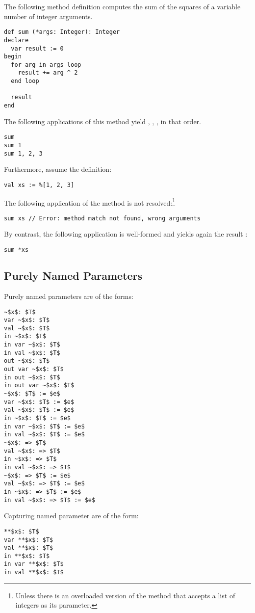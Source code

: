 \example The following method definition computes the sum of the squares of a variable number of integer arguments.
\begin{lstlisting}
def sum (*args: Integer): Integer
declare
  var result := 0
begin
  for arg in args loop
    result += arg ^ 2
  end loop
  
  result
end
\end{lstlisting}
The following applications of this method yield , , , in that order.
\begin{lstlisting}
sum
sum 1
sum 1, 2, 3
\end{lstlisting}
Furthermore, assume the definition:
\begin{lstlisting}
val xs := %[1, 2, 3]
\end{lstlisting}
The following application of the method  is not resolved:\footnote{Unless there is an overloaded version of the method that accepts a list of integers as its parameter.}
\begin{lstlisting}
sum xs // Error: method match not found, wrong arguments
\end{lstlisting}
By contrast, the following application is well-formed and yields again the result :
\begin{lstlisting}
sum *xs
\end{lstlisting}






\subsection{Purely Named Parameters}
\label{sec:named-parameters}
\label{sec:capturing-named-parameter}

Purely named parameters are of the forms:
\begin{lstlisting}
~$x$: $T$
var ~$x$: $T$
val ~$x$: $T$
in ~$x$: $T$
in var ~$x$: $T$
in val ~$x$: $T$
out ~$x$: $T$
out var ~$x$: $T$
in out ~$x$: $T$
in out var ~$x$: $T$
~$x$: $T$ := $e$
var ~$x$: $T$ := $e$
val ~$x$: $T$ := $e$
in ~$x$: $T$ := $e$
in var ~$x$: $T$ := $e$
in val ~$x$: $T$ := $e$
~$x$: => $T$
val ~$x$: => $T$
in ~$x$: => $T$
in val ~$x$: => $T$
~$x$: => $T$ := $e$
val ~$x$: => $T$ := $e$
in ~$x$: => $T$ := $e$
in val ~$x$: => $T$ := $e$
\end{lstlisting}

Capturing named parameter are of the form: 
\begin{lstlisting}
**$x$: $T$
var **$x$: $T$
val **$x$: $T$
in **$x$: $T$
in var **$x$: $T$
in val **$x$: $T$
\end{lstlisting}

